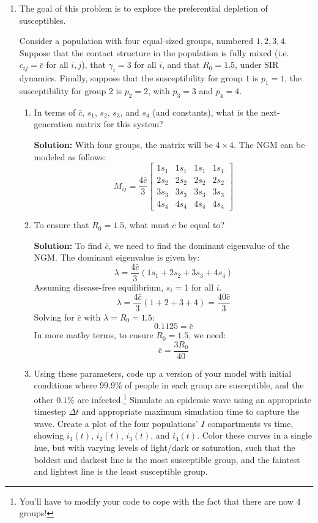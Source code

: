 \documentclass[11pt]{article}
\newenvironment{solution}{\par\noindent\begingroup\color{Blue}\textbf{Solution:} }{\par\endgroup}
\begin{document}
\begin{enumerate}

\item The goal of this problem is to explore the preferential depletion of susceptibles. 

Consider a population with four equal-sized groups, numbered $1, 2, 3, 4$. Suppose that the contact structure in the population is fully mixed (i.e. $c_{ij} = \bar{c}$ for all $i,j$), that $\gamma_i = 3$ for all $i$, and that $R_0=1.5$, under SIR dynamics. Finally, suppose that the susceptibility for group $1$ is $p_1=1$, the susceptibility for group $2$ is $p_2=2$, with $p_3 = 3$ and $p_4=4$. 

\begin{enumerate}[label=\alph*.]
	\item In terms of $\bar{c}$, $s_1$, $s_2$, $s_3$, and $s_4$ (and constants), what is the next-generation matrix for this system?
	    \begin{solution}
			 With four groups, the matrix will be $4 \times 4$.
			 The NGM can be modeled as follows: 
				\[
				M_{ij} = {\frac{4\bar{c}}{3}}\begin{bmatrix}
				1 s_1 & 1 s_1 & 1 s_1 & 1 s_1 \\
				2 s_2 & 2 s_2 & 2 s_2 & 2 s_2 \\
				3 s_3 & 3 s_3 & 3 s_3 & 3 s_3 \\
				4 s_4 & 4 s_4 & 4 s_4 & 4 s_4 
				\end{bmatrix}
				\]
		\end{solution}
	\item To ensure that $R_0=1.5$, what must $\bar{c}$ be equal to?
	    \begin{solution}
			 To find $\bar{c}$, we need to find the dominant eigenvalue of the NGM. 
			 The dominant eigenvalue is given by:
			 \[
			 \lambda = \frac{4\bar{c}}{3} (1 s_1 + 2 s_2 + 3 s_3 + 4 s_4)
			 \]
			 Assuming disease-free equilibrium, $s_i = 1$ for all $i$.
			 \[
			 \lambda = \frac{4\bar{c}}{3} (1 + 2 + 3 + 4) = \frac{40\bar{c}}{3}
			 \]
			 Solving for $\bar{c}$ with $\lambda = R_0 = 1.5$:
			 \[
			 0.1125 = \bar{c}
			 \]
			 In more mathy terms, to ensure $R_0 = 1.5$, we need:
			 \[
			 \bar{c} = \frac{3 R_0}{40}
			 \]
		\end{solution}
	\item Using these parameters, code up a version of your model with initial conditions where $99.9\%$ of people in each group are susceptible, and the other $0.1\%$ are infected.\footnote{You'll have to modify your code to cope with the fact that there are now 4 groups!} Simulate an epidemic wave using an appropriate timestep $\Delta t$ and appropriate maximum simulation time to capture the wave. Create a plot of the four populations' $I$ compartments vs time, showing $i_1(t)$, $i_2(t)$, $i_3(t)$, and $i_4(t)$. Color these curves in a single hue, but with varying levels of light/dark or saturation, such that the boldest and darkest line is the most susceptible group, and the faintest and lightest line is the least susceptible group.

\end{enumerate}
\end{enumerate}
\end{document}
